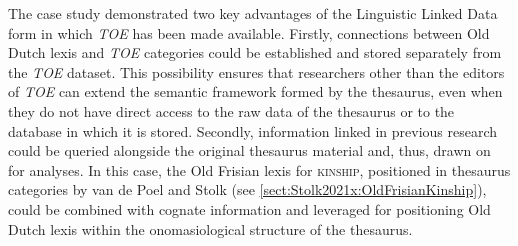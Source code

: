 The case study demonstrated two key advantages of the Linguistic Linked Data form in which \textit{TOE} has been made available. Firstly, connections between Old Dutch lexis and \textit{TOE} categories could be established and stored separately from the \textit{TOE} dataset. This possibility ensures that researchers other than the editors of \textit{TOE} can extend the semantic framework formed by the thesaurus, even when they do not have direct access to the raw data of the thesaurus or to the database in which it is stored. Secondly, information linked in previous research could be queried alongside the original thesaurus material and, thus, drawn on for analyses. In this case, the Old Frisian lexis for \textsc{kinship}, positioned in thesaurus categories by van de Poel and Stolk (see \ref{sect:Stolk2021x:OldFrisianKinship}), could be combined with cognate information and leveraged for positioning Old Dutch lexis within the onomasiological structure of the thesaurus.

